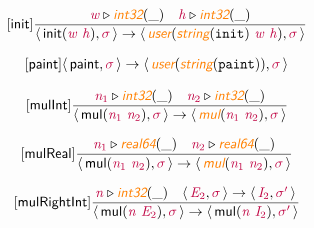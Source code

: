 \documentclass[10pt,leqno,fleqn]{article}
\newcommand{\artVariable}[1]{\mbox{\color{purple}\em #1\/}}
\newcommand{\artConstructor}[1]{\mbox{\sf #1}}
\newcommand{\artCaseInsensitiveLiteral}[1]{\mbox{\tt #1}}
\newcommand{\artSpecial}[1]{\mbox{\color{orange}\sf\em #1}}
\begin{document}
\begin{equation}
\tag*{[\artConstructor{\sf init}]}
\begin{split}\frac{ \artVariable{w}\triangleright \artSpecial{int32}(\_) \quad  \artVariable{h}\triangleright \artSpecial{int32}(\_) }{\langle\, \artConstructor{\sf init}(\artVariable{w}\ \artVariable{h}), \artVariable{$\sigma$}\,\rangle \rightarrow \langle\, \artSpecial{user}(\artSpecial{string}(\artCaseInsensitiveLiteral{init})\ \artVariable{w}\ \artVariable{h}), \artVariable{$\sigma$}\,\rangle }
\end{split}
\end{equation}

\begin{equation}
\tag*{[\artConstructor{\sf paint}]}
\begin{split}\langle\, \artConstructor{\sf paint}, \artVariable{$\sigma$}\,\rangle \rightarrow \langle\, \artSpecial{user}(\artSpecial{string}(\artCaseInsensitiveLiteral{paint})), \artVariable{$\sigma$}\,\rangle 
\end{split}
\end{equation}

\begin{equation}
\tag*{[\artConstructor{\sf mulInt}]}
\begin{split}\frac{ \artVariable{n$_{1}$}\triangleright \artSpecial{int32}(\_) \quad  \artVariable{n$_{2}$}\triangleright \artSpecial{int32}(\_) }{\langle\, \artConstructor{\sf mul}(\artVariable{n$_{1}$}\ \artVariable{n$_{2}$}), \artVariable{$\sigma$}\,\rangle \rightarrow \langle\, \artSpecial{mul}(\artVariable{n$_{1}$}\ \artVariable{n$_{2}$}), \artVariable{$\sigma$}\,\rangle }
\end{split}
\end{equation}

\begin{equation}
\tag*{[\artConstructor{\sf mulReal}]}
\begin{split}\frac{ \artVariable{n$_{1}$}\triangleright \artSpecial{real64}(\_) \quad  \artVariable{n$_{2}$}\triangleright \artSpecial{real64}(\_) }{\langle\, \artConstructor{\sf mul}(\artVariable{n$_{1}$}\ \artVariable{n$_{2}$}), \artVariable{$\sigma$}\,\rangle \rightarrow \langle\, \artSpecial{mul}(\artVariable{n$_{1}$}\ \artVariable{n$_{2}$}), \artVariable{$\sigma$}\,\rangle }
\end{split}
\end{equation}

\begin{equation}
\tag*{[\artConstructor{\sf mulRightInt}]}
\begin{split}\frac{ \artVariable{n}\triangleright \artSpecial{int32}(\_) \quad \langle\, \artVariable{E$_{2}$}, \artVariable{$\sigma$}\,\rangle \rightarrow \langle\, \artVariable{I$_{2}$}, \artVariable{$\sigma$\/$^\prime$}\,\rangle }{\langle\, \artConstructor{\sf mul}(\artVariable{n}\ \artVariable{E$_{2}$}), \artVariable{$\sigma$}\,\rangle \rightarrow \langle\, \artConstructor{\sf mul}(\artVariable{n}\ \artVariable{I$_{2}$}), \artVariable{$\sigma$\/$^\prime$}\,\rangle }
\end{split}
\end{equation}
\end{document}
